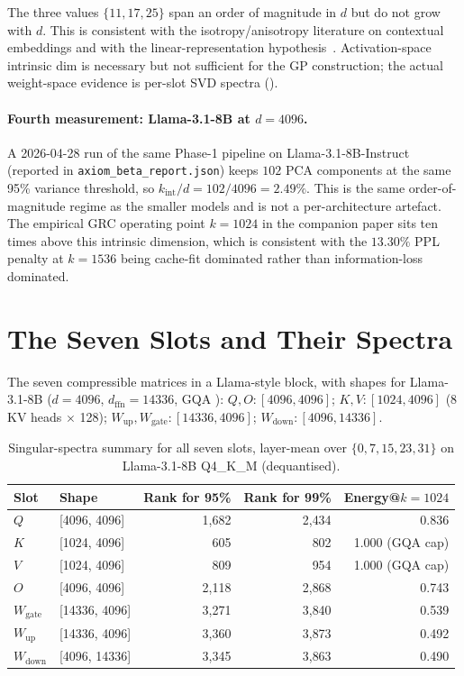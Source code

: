 \documentclass[11pt]{article}
\begin{document}
The three values $\{11,17,25\}$ span an order of magnitude in $d$ but do
not grow with $d$.  This is consistent with the
isotropy/anisotropy literature on contextual embeddings and with the
linear-representation hypothesis~\cite{elhage2022superposition}.
Activation-space intrinsic dim is necessary but not sufficient for the GP
construction; the actual weight-space evidence is per-slot SVD spectra
().

\paragraph{Fourth measurement: Llama-3.1-8B at $d{=}4096$.}
A 2026-04-28 run of the same Phase-1 pipeline on Llama-3.1-8B-Instruct
(reported in \texttt{axiom\_beta\_report.json}) keeps $102$ PCA components
at the same 95\% variance threshold, so $k_\text{int}/d = 102/4096 =
2.49\%$. This is the same order-of-magnitude regime as the smaller models
and is not a per-architecture artefact. The empirical GRC operating
point $k{=}1024$ in the companion paper sits ten times above this
intrinsic dimension, which is consistent with the $13.30\%$ PPL penalty
at $k{=}1536$ being cache-fit dominated rather than information-loss
dominated.

\section{The Seven Slots and Their Spectra}
\label{sec:spectra}

The seven compressible matrices in a Llama-style block, with shapes for
Llama-3.1-8B ($d{=}4096$, $d_\text{ffn}{=}14336$, GQA \cite{ainslie2023gqa}):
$Q,O\!:\![4096,4096]$;
$K,V\!:\![1024,4096]$ (8 KV heads $\times$ 128);
$W_\text{up},W_\text{gate}\!:\![14336,4096]$;
$W_\text{down}\!:\![4096,14336]$.

\begin{table}[h]\centering\small
\caption{Singular-spectra summary for all seven slots, layer-mean over
$\{0,7,15,23,31\}$ on Llama-3.1-8B Q4\_K\_M (dequantised).}
\label{tab:slots}
\begin{tabular}{@{}llrrr@{}}
\toprule
Slot & Shape & Rank for 95\% & Rank for 99\% & Energy@$k{=}1024$ \\
\midrule
$Q$               & [4096, 4096]   & 1{,}682 & 2{,}434 & 0.836 \\
$K$               & [1024, 4096]   &   605   &   802   & 1.000 (GQA cap) \\
$V$               & [1024, 4096]   &   809   &   954   & 1.000 (GQA cap) \\
$O$               & [4096, 4096]   & 2{,}118 & 2{,}868 & 0.743 \\
$W_\text{gate}$   & [14336, 4096]  & 3{,}271 & 3{,}840 & 0.539 \\
$W_\text{up}$     & [14336, 4096]  & 3{,}360 & 3{,}873 & 0.492 \\
$W_\text{down}$   & [4096, 14336]  & 3{,}345 & 3{,}863 & 0.490 \\
\bottomrule
\end{tabular}
\end{table}
\end{document}
